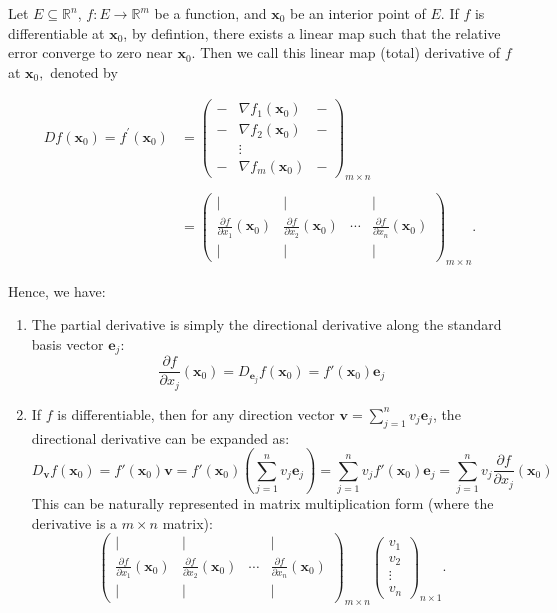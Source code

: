 \begin{remark}
Let $E \subseteq \mathbb{R}^n$, $f: E \to \mathbb{R}^m$ be a function, and $\mathbf{x}_0$ be an interior point of $E$.
If $f$ is differentiable at $\mathbf{x}_0$, by defintion, there exists a linear map such that the relative error converge to zero near $\mathbf{x}_0.$
Then we call this linear map (total) derivative of $f$ at $\mathbf{x}_0,$ denoted by

\begin{align*}
Df(\mathbf{x}_0) = f^\prime(\mathbf{x}_0) &=
\begin{pmatrix}
- & \nabla f_1(\mathbf{x}_0) & - \\
- & \nabla f_2(\mathbf{x}_0) & - \\
  & \vdots & \\
- & \nabla f_m(\mathbf{x}_0) & - 
\end{pmatrix}_{m \times n}\\ \\ &= 
\begin{pmatrix}
| & | & & | \\
\frac{\partial f}{\partial x_1}(\mathbf{x}_0) & \frac{\partial f}{\partial x_2}(\mathbf{x}_0) & \cdots & \frac{\partial f}{\partial x_n}(\mathbf{x}_0) \\
| & | & & |
\end{pmatrix}_{m \times n}.    
\end{align*}
\end{remark}

Hence, we have:
\begin{enumerate}
    \item The partial derivative is simply the directional derivative along the standard basis vector $\mathbf{e}_j:$
    $$ \frac{\partial f}{\partial x_j}(\mathbf{x}_0) = D_{\mathbf{e}_j} f(\mathbf{x}_0) = f'(\mathbf{x}_0) \mathbf{e}_j $$
    
    \item If $f$ is differentiable, then for any direction vector $\mathbf{v} = \sum_{j=1}^n v_j \mathbf{e}_j$, the directional derivative can be expanded as:
    $$ D_{\mathbf{v}} f(\mathbf{x}_0) = f'(\mathbf{x}_0) \mathbf{v} = f'(\mathbf{x}_0) \left( \sum_{j=1}^n v_j \mathbf{e}_j \right) = \sum_{j=1}^n v_j f'(\mathbf{x}_0) \mathbf{e}_j = \sum_{j=1}^n v_j \frac{\partial f}{\partial x_j}(\mathbf{x}_0) $$
    This can be naturally represented in matrix multiplication form (where the derivative is a $m \times n$ matrix):
    $$ \begin{pmatrix}
    | & | & & | \\
    \frac{\partial f}{\partial x_1}(\mathbf{x}_0) & \frac{\partial f}{\partial x_2}(\mathbf{x}_0) & \cdots & \frac{\partial f}{\partial x_n}(\mathbf{x}_0) \\
    | & | & & |
    \end{pmatrix}_{m \times n}
    \begin{pmatrix}
    v_1 \\
    v_2 \\
    \vdots \\
    v_n
    \end{pmatrix}_{n \times 1}. $$
\end{enumerate}



